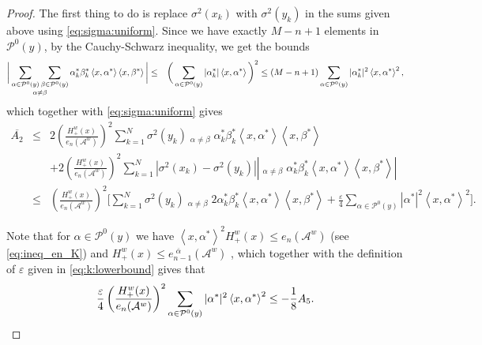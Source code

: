 \documentclass{article}
\numberwithin{equation}{section}
\newcommand{\Aa}{\mathcal{A}^{w}}
\newcommand{\xas}{\left<x,\alpha^*\right>}
\newcommand{\xbs}{\left<x,\beta^*\right>}
\newcommand{\shift}{\,\,}
\newcommand{\eA}[1]{e_{#1}(\Aa)}
\newcommand{\eaA}[1]{e_{#1}^{\shift\overline{\alpha}}(\Aa)}
\newcommand{\Pzero}{\mathcal{P}^0(y)}
\theoremstyle{plain}
\begin{document}
\begin{proof}
The first thing to do is replace $\sigma^2(x_k)$ with $\sigma^2(y_k)$ in the sums given above using \ref{eq:sigma:uniform}. Since we have exactly $M-n+1$ elements in $\Pzero$, by the Cauchy-Schwarz inequality, we get the bounds
\begin{eqnarray*}
\bigg|\mathop{\sum_{\alpha\in\Pzero}\sum_{\beta\in\Pzero}}_{\alpha\neq \beta} \alpha_k^*\beta_k^* \xas\xbs \bigg|&\leq&
\bigg(\sum_{\alpha\in\Pzero}|\alpha_k^*|\xas\bigg)^2 \leq  (M-n+1) \sum_{\alpha\in\Pzero}|\alpha_k^*|^2\xas^2\/,
\end{eqnarray*}
which together with \ref{eq:sigma:uniform} gives
\begin{eqnarray*}
    \overline{A_2} &\leq&  2\left(\frac{H_+^w(x)}{\eA{n}}\right)^2
\sum_{k=1}^N \sigma^2(y_k)
\mathop{\sum_{\alpha\in\Pzero}\sum_{\beta\in\Pzero}}_{\alpha\neq \beta} \alpha_k^*\beta_k^* \xas\xbs\\
&&+
2\left(\frac{H_+^w(x)}{\eA{n}}\right)^2
\sum_{k=1}^N
|\sigma^2(x_k)-\sigma^2(y_k)|
\left|
\mathop{\sum_{\alpha\in\Pzero}\sum_{\beta\in\Pzero}}_{\alpha\neq \beta} \alpha_k^*\beta_k^* \xas\xbs
\right|\\
    &\leq&\left(\frac{H_+^w(x)}{\eA{n}}\right)^2\Bigg[\sum_{k=1}^N \sigma^2(y_k)\mathop{\sum_{\alpha\in\Pzero}\sum_{\beta\in\Pzero}}_{\alpha\neq \beta} 2\alpha_k^*\beta_k^* \xas\xbs +\frac{\varepsilon}{4}\sum_{\alpha\in\Pzero}|\alpha^*|^2\xas^2\Bigg].
\end{eqnarray*}

Note that for $\alpha\in\Pzero$ we have $\xas^2 H^w_+(x)\leq \eA{n}$ (see \eqref{eq:ineq_en_K}) and $H^w_+(x)\leq \eaA{n-1}$
, which together with the definition of $\varepsilon$ given in \ref{eq:k:lowerbound} gives that 
    \begin{eqnarray*}
        \frac{\varepsilon}{4}\left(\frac{H_+^w(x)}{\eA{n}}\right)^2\sum_{\alpha\in\Pzero}|\alpha^*|^2\xas^2\leq -\frac{1}{8}A_5\/.
    \end{eqnarray*}


\end{proof}
\end{document}
